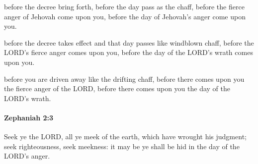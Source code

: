 			\begin{versebox}
					\item[BHS] 
					\item[LXX] 
					\item[ASV] before the decree bring forth, before the day pass as the chaff, before the fierce anger of Jehovah come upon you, before the day of Jehovah's anger come upon you.
					\item[NIV] before the decree takes effect and that day passes like windblown chaff, before the LORD’s fierce anger comes upon you, before the day of the LORD’s wrath comes upon you.
					\item[NRSV] before you are driven away like the drifting chaff, before there comes upon you the fierce anger of the LORD, before there comes upon you the day of the LORD’s wrath.
			\end{versebox}

		\paragraph{Zephaniah 2:3} %
			\label{ZEPHANIAH-2-3}

			Seek ye the LORD, all ye meek of the earth, which have wrought his judgment; seek righteousness, seek meekness: it may be ye shall be hid in the day of the LORD’s anger.

